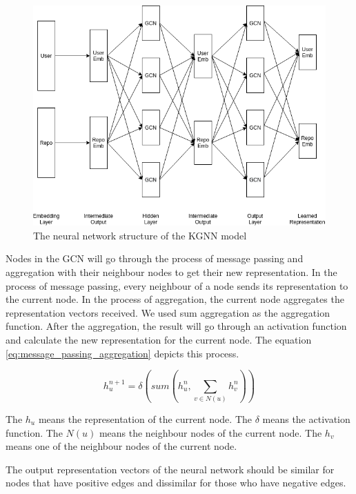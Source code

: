 \documentclass[11pt,twoside]{report}
\begin{document}
\begin{figure}[H]
    \centering
    \includegraphics[scale=0.6]{KGCN Structure.png}
    \caption{The neural network structure of the KGNN model}
    \label{fig:kgnn_structure}
\end{figure}

Nodes in the GCN will go through the process of message passing and aggregation with their neighbour nodes to get their new representation. In the process of message passing, every neighbour of a node sends its representation to the current node. In the process of aggregation, the current node aggregates the representation vectors received. We used sum aggregation as the aggregation function. After the aggregation, the result will go through an activation function and calculate the new representation for the current node. The equation \ref{eq:message_passing_aggregation} depicts this process.

\begin{equation}
    h_u^{n+1}=\delta(sum(h_u^n, \sum_{v\in{N(u)}}h_v^n))
    \label{eq:message_passing_aggregation}
\end{equation}

The $h_u$ means the representation of the current node. The $\delta$ means the activation function. The $N(u)$ means the neighbour nodes of the current node. The $h_v$ means one of the neighbour nodes of the current node.

The output representation vectors of the neural network should be similar for nodes that have positive edges and dissimilar for those who have negative edges.
\end{document}
